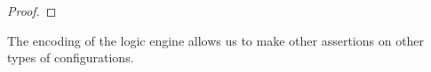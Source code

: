 \begin{proof}
% 
\end{proof}

The encoding of the logic engine allows us to make other assertions on other types of 
configurations.
